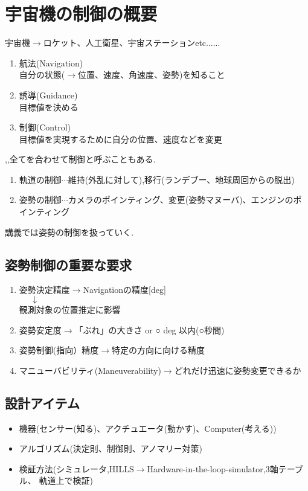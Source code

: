 \documentclass[class=article, crop=false, dvipdfmx, fleqn]{standalone}
\begin{document}
\section{宇宙機の制御の概要}

宇宙機$\rightarrow$ロケット、人工衛星、宇宙ステーションetc......
\begin{enumerate}[label = \maru{\theenumi}]
\item 航法(Navigation)\\
自分の状態($\rightarrow$位置、速度、角速度、姿勢)を知ること
\item 誘導(Guidance)\\
目標値を決める
\item 制御(Control)\\
目標値を実現するために自分の位置、速度などを変更
\end{enumerate}
,,全てを合わせて制御と呼ぶこともある.

\begin{enumerate}
      \renewcommand{\labelenumi}{\alph{enumi}).}
      \item 軌道の制御$\cdots$維持(外乱に対して),移行(ランデブー、地球周回からの脱出)
      \item 姿勢の制御$\cdots$カメラのポインティング、変更(姿勢マヌーバ)、エンジンのポインティング
\end{enumerate}
講義では姿勢の制御を扱っていく.


\subsection{姿勢制御の重要な要求}
\begin{enumerate}
\item 姿勢決定精度$\rightarrow$Navigationの精度[deg]\\
		$\mbox{    　}\downarrow$\\
 観測対象の位置推定に影響
\item 姿勢安定度$\rightarrow$「ぶれ」の大きさ  or ○ deg 以内(○秒間)
\item 姿勢制御(指向）精度$\rightarrow$特定の方向に向ける精度
\item マニューバビリティ(Maneuverability)$\rightarrow$どれだけ迅速に姿勢変更できるか
\end{enumerate}


\subsection{設計アイテム}
\begin{itemize}
\item 機器(センサー(知る)、アクチュエータ(動かす)、Computer(考える))
\item アルゴリズム(決定則、制御則、アノマリー対策)
\item 検証方法(シミュレータ,HILLS$\rightarrow$Hardware-in-the-loop-simulator,3軸テーブル、
軌道上で検証)
\end{itemize}
\end{document}
